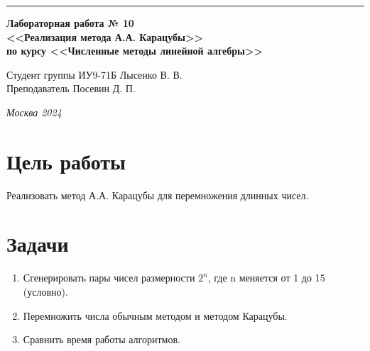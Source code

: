 \documentclass[a4paper, 14pt]{extarticle}
\begin{document}
\begin{titlepage}
\vspace*{-16pt}
\hspace{30pt}\rule{0.866\textwidth}{0.4pt}
  
\vspace{11em}

\begin{center}
\Large {\bf Лабораторная работа № 10} \\ 
\large {\bf<<Реализация метода А.А. Карацубы>>} \\ 
\large {\bf по курсу <<Численные методы линейной алгебры>>} \\ 
\end{center}\normalsize

\vspace{8em}


\begin{flushright}
  {Студент группы ИУ9-71Б Лысенко В. В.\hspace*{15pt} \\
  \vspace{2ex}
  Преподаватель Посевин Д. П.\hspace*{15pt}}
\end{flushright}

\bigskip

\vfill
 

\begin{center}
\textsl{Москва 2024}
\end{center}
\end{titlepage}

\renewcommand{\ttdefault}{pcr}

\setlength{\tabcolsep}{3pt}
\newpage
\setcounter{page}{2}

\section{Цель работы}\label{Sect::task}
\par
\renewcommand{\labelenumii}{\arabic{enumi}.\arabic{enumii}.}
Реализовать метод А.А. Карацубы для перемножения длинных чисел.

\section{Задачи}\label{Sect::task}
\par
\renewcommand{\labelenumii}{\arabic{enumi}.\arabic{enumii}.}
\begin{enumerate} 
    \item Сгенерировать пары чисел размерности $2^{n}$, где n меняется от 1 до 15 (условно).
    \item Перемножить числа обычным методом и методом Карацубы.
    \item Сравнить время работы алгоритмов.
\end{enumerate}
\end{document}
